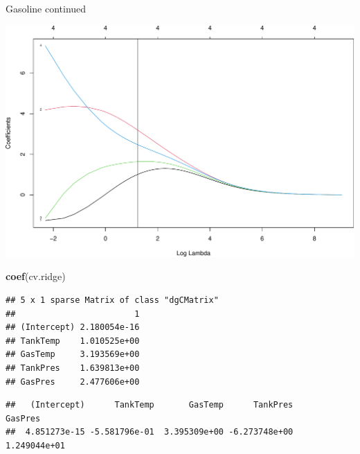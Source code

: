 \documentclass[
  ignorenonframetext,
]{beamer}
\newenvironment{Shaded}{\begin{snugshade}}{\end{snugshade}}
\newcommand{\CommentTok}[1]{\textcolor[rgb]{0.56,0.35,0.01}{\textit{#1}}}
\newcommand{\DataTypeTok}[1]{\textcolor[rgb]{0.13,0.29,0.53}{#1}}
\newcommand{\FloatTok}[1]{\textcolor[rgb]{0.00,0.00,0.81}{#1}}
\newcommand{\KeywordTok}[1]{\textcolor[rgb]{0.13,0.29,0.53}{\textbf{#1}}}
\newcommand{\NormalTok}[1]{#1}
\newcommand{\OperatorTok}[1]{\textcolor[rgb]{0.81,0.36,0.00}{\textbf{#1}}}
\newcommand{\OtherTok}[1]{\textcolor[rgb]{0.56,0.35,0.01}{#1}}
\newcommand{\StringTok}[1]{\textcolor[rgb]{0.31,0.60,0.02}{#1}}
\begin{document}
\begin{frame}[fragile]
\begin{block}{Gasoline continued}
\begin{Shaded}
\end{Shaded}

\includegraphics{L2_files/figure-beamer/unnamed-chunk-10-2.pdf}

\begin{Shaded}
\begin{Highlighting}[]
\KeywordTok{coef}\NormalTok{(cv.ridge)}
\end{Highlighting}
\end{Shaded}

\begin{verbatim}
## 5 x 1 sparse Matrix of class "dgCMatrix"
##                        1
## (Intercept) 2.180054e-16
## TankTemp    1.010525e+00
## GasTemp     3.193569e+00
## TankPres    1.639813e+00
## GasPres     2.477606e+00
\end{verbatim}

\begin{Shaded}
\end{Shaded}

\begin{verbatim}
##   (Intercept)      TankTemp       GasTemp      TankPres       GasPres 
##  4.851273e-15 -5.581796e-01  3.395309e+00 -6.273748e+00  1.249044e+01
\end{verbatim}


\end{block}
\end{frame}
\end{document}
